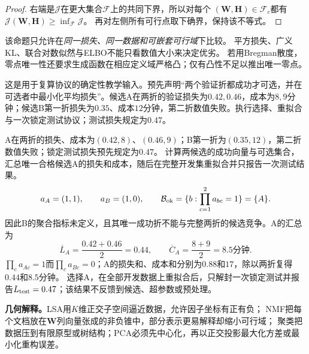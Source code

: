 \begin{proof}
右端是$\mathcal J$在更大集合$\mathcal F$上的共同下界，所以对每个
$(\boldsymbol W,\boldsymbol H)\in\mathcal F_c$都有
$\mathcal J(\boldsymbol W,\boldsymbol H)\ge\inf_{\mathcal F}\mathcal J$。
再对左侧所有可行点取下确界，保持该不等式。
\end{proof}
该命题只允许在\emph{同一损失、同一数据和可嵌套可行域}下比较。
平方损失、广义KL、联合对数似然与ELBO不能只看数值大小来决定优劣。
若用Bregman散度，零点唯一性还要求生成函数在相应定义域严格凸；仅有凸性不足以推出唯一零点。

\begin{example}\label{exm:V5-C08-two-candidate-selection}
这是用于复算协议的确定性教学输入。预先声明“两个验证折都成功才可选，并在可选者中最小化平均损失”。候选A在两折的验证损失为$0.42,0.46$，成本为$8,9$分钟；候选B第一折损失为$0.35$、成本$12$分钟，第二折数值失败。执行选择、重拟合与一次锁定测试协议；测试损失规定为$0.47$。
\end{example}

\begin{solution}
\SolGiven A在两折的损失、成本为$(0.42,8)$、$(0.46,9)$；B第一折为$(0.35,12)$，第二折数值失败；锁定测试损失预先规定为$0.47$。
\SolPlan 计算两候选的成功向量与可选集合，汇总唯一合格候选A的损失和成本，随后在完整开发集重拟合并只报告一次测试结果。
\SolDerive
\[
a_A=(1,1),\qquad a_B=(1,0),\qquad
\mathcal B_{\rm ok}=\{b:\prod_{c=1}^2a_{bc}=1\}=\{A\}.
\]
因此B的聚合指标未定义，且其唯一成功折不能与完整两折的候选竞争。A的汇总为
\[
\overline L_A=\frac{0.42+0.46}{2}=0.44,\qquad
\overline C_A=\frac{8+9}{2}=8.5\text{分钟}.
\]
\SolCheck $\prod_ca_{Ac}=1$而$\prod_ca_{Bc}=0$；A的损失和、成本和分别为$0.88$和$17$，除以两折复得$0.44$和$8.5$分钟。
\SolAnswer 选择A，在全部开发数据上重拟合后，只解封一次锁定测试并报告$L_{\rm test}=0.47$；该结果不反馈到候选、超参数或预处理。
\end{solution}


\label{struct:V5-C08-CH14}
\textbf{几何解释。}LSA用$K$维正交子空间逼近数据，允许因子坐标有正有负；
NMF把每个文档放在$\boldsymbol W$列向量张成的非负锥中，部分表示更易解释却缩小可行域；
聚类把数据压到有限原型或树结构；PCA必须先中心化，再以正交投影最大化方差或最小化重构误差。

